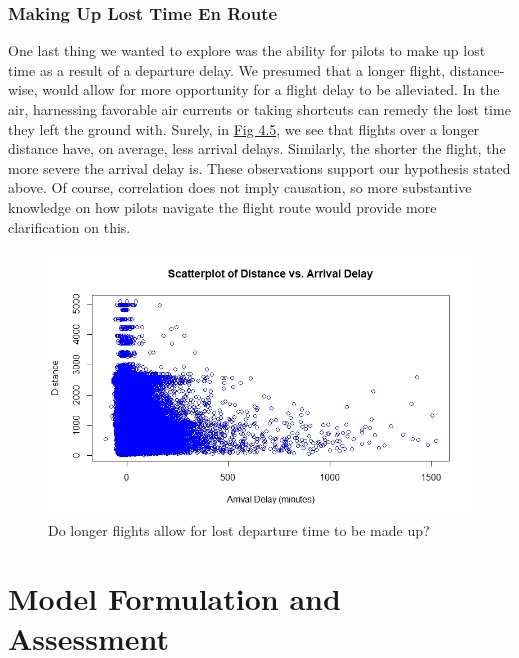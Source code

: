 \documentclass[12pt, a4paper, openany]{book}
\newcommand\tab[1][1cm]{\hspace*{#1}}
\begin{document}
		\subsection{Making Up Lost Time En Route}
			\tab One last thing we wanted to explore was the ability for pilots to make up lost time as a result of a departure delay. We presumed that a longer flight, distance-wise, would allow for more opportunity for a flight delay to be alleviated. In the air, harnessing favorable air currents or taking shortcuts can remedy the lost time they left the ground with. Surely, in \underline{Fig 4.5}, we see that flights over a longer distance have, on average, less arrival delays. Similarly, the shorter the flight, the more severe the arrival delay is. These observations support our hypothesis stated above. Of course, correlation does not imply causation, so more substantive knowledge on how pilots navigate the flight route would provide more clarification on this. \\
			\begin{figure}
			\centering
	 		\includegraphics[width = 0.75 \textwidth]{../figures/PLOTS FOR REPORT/Chapter 4/Figure 4.8}
	 		\caption{Do longer flights allow for lost departure time to be made up?}
	 		\end{figure}
\chapter{Model Formulation and Assessment}
\end{document}
